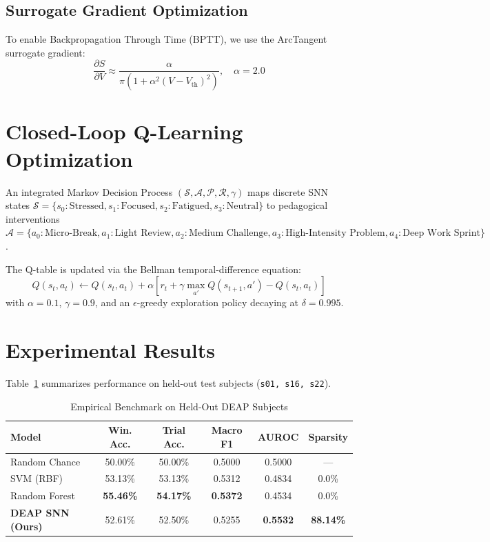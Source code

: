 \documentclass[journal]{IEEEtran}
\begin{document}
\subsection{Surrogate Gradient Optimization}
To enable Backpropagation Through Time (BPTT), we use the ArcTangent surrogate gradient:
\begin{equation}
\frac{\partial S}{\partial V} \approx \frac{\alpha}{\pi (1 + \alpha^2 (V - V_{\text{th}})^2)}, \quad \alpha = 2.0
\end{equation}

\section{Closed-Loop Q-Learning Optimization}
An integrated Markov Decision Process $(\mathcal{S}, \mathcal{A}, \mathcal{P}, \mathcal{R}, \gamma)$ maps discrete SNN states $\mathcal{S} = \{s_0: \text{Stressed}, s_1: \text{Focused}, s_2: \text{Fatigued}, s_3: \text{Neutral}\}$ to pedagogical interventions $\mathcal{A} = \{a_0: \text{Micro-Break}, a_1: \text{Light Review}, a_2: \text{Medium Challenge}, a_3: \text{High-Intensity Problem}, a_4: \text{Deep Work Sprint}\}$.

The Q-table is updated via the Bellman temporal-difference equation:
\begin{equation}
Q(s_t, a_t) \leftarrow Q(s_t, a_t) + \alpha \left[ r_t + \gamma \max_{a'} Q(s_{t+1}, a') - Q(s_t, a_t) \right]
\end{equation}
with $\alpha = 0.1$, $\gamma = 0.9$, and an $\epsilon$-greedy exploration policy decaying at $\delta = 0.995$.

\section{Experimental Results}
Table~\ref{tab:results} summarizes performance on held-out test subjects (\texttt{s01, s16, s22}).

\begin{table}[htbp]
\caption{Empirical Benchmark on Held-Out DEAP Subjects}
\label{tab:results}
\centering
\begin{tabular}{lccccc}
\toprule
\textbf{Model} & \textbf{Win. Acc.} & \textbf{Trial Acc.} & \textbf{Macro F1} & \textbf{AUROC} & \textbf{Sparsity} \\
\midrule
Random Chance & 50.00\% & 50.00\% & 0.5000 & 0.5000 & --- \\
SVM (RBF) & 53.13\% & 53.13\% & 0.5312 & 0.4834 & 0.0\% \\
Random Forest & \textbf{55.46\%} & \textbf{54.17\%} & \textbf{0.5372} & 0.4534 & 0.0\% \\
\textbf{DEAP SNN (Ours)} & 52.61\% & 52.50\% & 0.5255 & \textbf{0.5532} & \textbf{88.14\%} \\
\bottomrule
\end{tabular}
\end{table}
\end{document}
